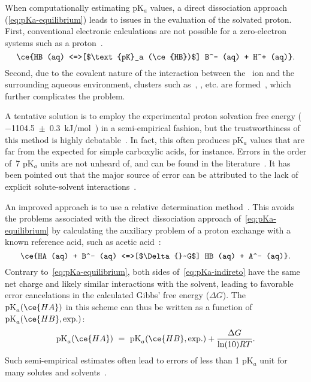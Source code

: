 When computationally estimating pK$_a$ values,
a direct dissociation approach (\cref{eq:pKa-equilibrium})
leads to issues in the evaluation of the solvated proton.
First,
conventional electronic calculations are not possible for a zero-electron
systems such as a proton~\cite{Ding_2009,Sumon_2012}.
%
\begin{equation}
	\ce{HB (aq) <=>[$\text{pK}_a (\ce{HB})$] B^- (aq) + H^+ (aq)}\text{.}
	\label{eq:pKa-equilibrium}
\end{equation}
%
Second,
due to the covalent nature of the interaction between the~ ion
and the surrounding aqueous environment,
clusters such
as~,
,
etc.
are formed~\cite{Sumon_2012},
which further complicates the problem.

A tentative solution is to employ the experimental proton solvation free energy
($-$1104.5~$\pm$~0.3~kJ/mol~\cite{Tissandier_1998,Marenich_2009}) in a
semi-empirical fashion,
but the trustworthiness of this method is highly
debatable~\cite{Yang_2013}.
In fact,
this often produces pK$_a$ values that are far from the expected
for simple carboxylic acids,
for instance.
Errors in the order of~7 pK$_a$ units are not unheard of,
and can be found in the literature~\cite{Pliego_2002,Ding_2009}.
It has been pointed out that the major source of error can be attributed to the lack of explicit
solute-solvent interactions~\cite{Pliego_2002}.

An improved approach is to use a relative determination method~\cite{Ding_2009}.
This avoids the problems associated with the direct dissociation approach of~\cref{eq:pKa-equilibrium}
by calculating the auxiliary problem of a proton exchange with a known reference
acid,
such as acetic acid~\cite{Goldberg_2002}:
%
\begin{equation}
	\ce{HA (aq) + B^- (aq) <=>[$\Delta{}~G$] HB (aq) + A^- (aq)}\text{.}
	\label{eq:pKa-indireto}
\end{equation}
%
Contrary to~\cref{eq:pKa-equilibrium},
both sides of~\cref{eq:pKa-indireto}
have the same net charge
and likely similar interactions with the solvent,
leading to favorable error cancelations
in the calculated Gibbs' free energy ($\Delta G$).
The~$\text{pK}_a(\ce{HA})$ in this scheme
can thus be written as a function of~$\text{pK}_a(\ce{HB},
	\text{exp.})$:
%
\begin{equation}
	\text{pK}_a(\ce{HA})~=~\text{pK}_a(\ce{HB},
	\text{exp.}) + \frac{\Delta G}{\ln(10) R T}\text{.}
\end{equation}
%
Such semi-empirical estimates often lead to errors of less than 1 pK$_a$
unit for many solutes and solvents~\cite{Ding_2009}.

